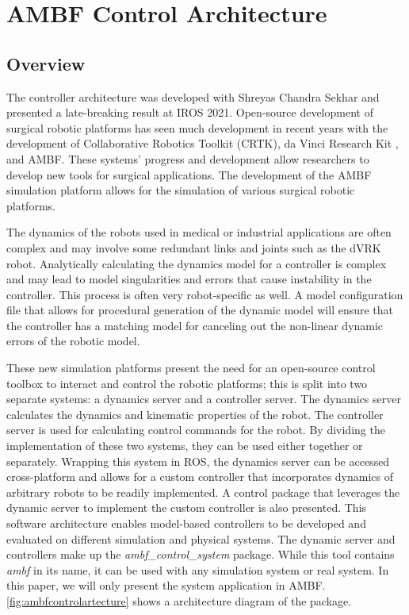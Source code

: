  
 
 \section{AMBF Control Architecture}
 \label{sec:controlarchitecture}
 
 \subsection{Overview}
 The controller architecture was developed with Shreyas Chandra Sekhar and presented a late-breaking result at IROS 2021. Open-source development of surgical robotic platforms has seen much development in recent years with the development of Collaborative Robotics Toolkit (CRTK)\cite{su2020collaborative}, da Vinci Research Kit \cite{d2021accelerating}, and AMBF. These systems' progress and development allow researchers to develop new tools for surgical applications. The development of the  AMBF simulation platform allows for the simulation of various surgical robotic platforms. 

The dynamics of the robots used in medical or industrial applications are often complex and may involve some redundant links and joints such as the dVRK robot\cite{wang2019convex}. Analytically calculating the dynamics model for a controller is complex and may lead to model singularities and errors that cause instability in the controller. This process is often very robot-specific as well. A model configuration file that allows for procedural generation of the dynamic model will ensure that the controller has a matching model for canceling out the non-linear dynamic errors of the robotic model.

These new simulation platforms present the need for an open-source control toolbox to interact and control the robotic platforms; this is split into two separate systems: a dynamics server and a controller server. The dynamics server calculates the dynamics and kinematic properties of the robot. The controller server is used for calculating control commands for the robot. By dividing the implementation of these two systems, they can be used either together or separately. Wrapping this system in ROS, the dynamics server can be accessed cross-platform and allows for a custom controller that incorporates dynamics of arbitrary robots to be readily implemented. A control package that leverages the dynamic server to implement the custom controller is also presented. This software architecture enables model-based controllers to be developed and evaluated on different simulation and physical systems. The dynamic server and controllers make up the \textit{ambf\_control\_system} package. While this tool contains \textit{ambf} in its name, it can be used with any simulation system or real system. In this paper, we will only present the system application in AMBF. \autoref{fig:ambfcontrolartecture} shows a architecture diagram of the package. 
 

